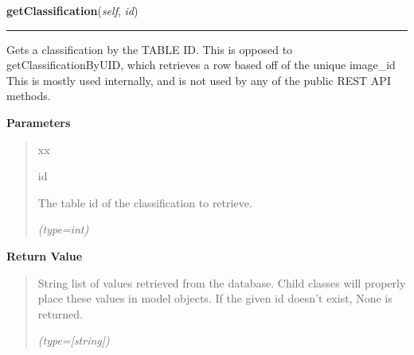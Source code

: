 \hspace{.8\funcindent}\begin{boxedminipage}{\funcwidth}

    \raggedright \textbf{getClassification}(\textit{self}, \textit{id})

    \vspace{-1.5ex}

    \rule{\textwidth}{0.5\fboxrule}
\setlength{\parskip}{2ex}
    Gets a classification by the TABLE ID. This is opposed to 
    getClassificationByUID, which retrieves a row based off of the unique 
    image\_id This is mostly used internally, and is not used by any of the
    public REST API methods.

\setlength{\parskip}{1ex}
      \textbf{Parameters}
      \vspace{-1ex}

      \begin{quote}
        \begin{Ventry}{xx}

          \item[id]

          The table id of the classification to retrieve.

            {\it (type=int)}

        \end{Ventry}

      \end{quote}

      \textbf{Return Value}
    \vspace{-1ex}

      \begin{quote}
      String list of values retrieved from the database. Child classes will
      properly place these values in model objects. If the given id doesn't
      exist, None is returned.

      {\it (type=[string])}

      \end{quote}

    \end{boxedminipage}

    \label{src:dao:classification_dao:ClassificationDAO:getAll}

    \vspace{0.5ex}

